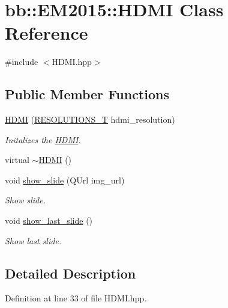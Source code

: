 \hypertarget{classbb_1_1_e_m2015_1_1_h_d_m_i}{}\section{bb\+:\+:E\+M2015\+:\+:H\+D\+M\+I Class Reference}
\label{classbb_1_1_e_m2015_1_1_h_d_m_i}


{\ttfamily \#include $<$H\+D\+M\+I.\+hpp$>$}

\subsection*{Public Member Functions}
\begin{DoxyCompactItemize}
\item 
\hyperlink{classbb_1_1_e_m2015_1_1_h_d_m_i_a544fd38ecef80cdceae18e490728914f}{H\+D\+M\+I} (\hyperlink{_external_display_8hpp_aec53cff8866c55706875f08a5cb6aa6a}{R\+E\+S\+O\+L\+U\+T\+I\+O\+N\+S\+\_\+\+T} hdmi\+\_\+resolution)
\begin{DoxyCompactList}\small\item\em Initalizes the \hyperlink{classbb_1_1_e_m2015_1_1_h_d_m_i}{H\+D\+M\+I}. \end{DoxyCompactList}\item 
virtual \hyperlink{classbb_1_1_e_m2015_1_1_h_d_m_i_a0b91fc12464fa9917ac04ede01a86bc2}{$\sim$\+H\+D\+M\+I} ()
\item 
void \hyperlink{classbb_1_1_e_m2015_1_1_h_d_m_i_a1b20264468d1ebdd08f2bfbdfc54327f}{show\+\_\+slide} (Q\+Url img\+\_\+url)
\begin{DoxyCompactList}\small\item\em Show slide. \end{DoxyCompactList}\item 
void \hyperlink{classbb_1_1_e_m2015_1_1_h_d_m_i_a67b5356472ba2f1a9123169e2e9f0c4b}{show\+\_\+last\+\_\+slide} ()
\begin{DoxyCompactList}\small\item\em Show last slide. \end{DoxyCompactList}\end{DoxyCompactItemize}


\subsection{Detailed Description}


Definition at line 33 of file H\+D\+M\+I.\+hpp.



